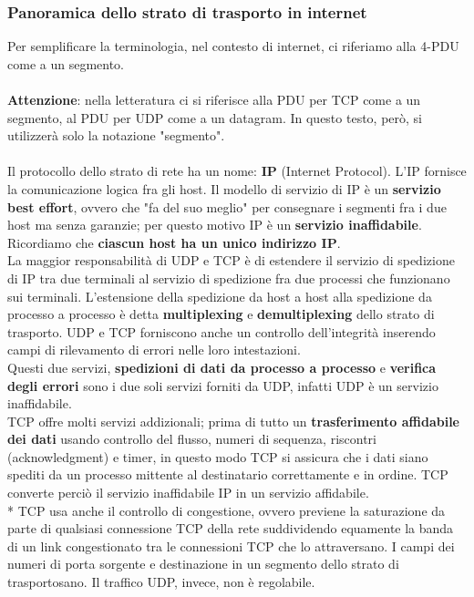 \documentclass[11pt,a4paper]{article}
\begin{document}
\subsubsection{Panoramica dello strato di trasporto in internet}
Per semplificare la terminologia, nel contesto di internet, ci riferiamo alla 4-PDU come a un segmento. \\ \\
\textbf{Attenzione}: nella letteratura ci si riferisce alla PDU per TCP come a un segmento, al PDU per UDP come a un datagram. In questo testo, però, si utilizzerà solo la notazione "segmento".\\ \\
Il protocollo dello strato di rete ha un nome: \textbf{IP} (Internet Protocol). L'IP fornisce la comunicazione logica fra gli host. Il modello di servizio di IP è un \textbf{servizio best effort}, ovvero che "fa del suo meglio" per consegnare i segmenti fra i due host ma senza garanzie; per questo motivo IP è un \textbf{servizio inaffidabile}. Ricordiamo che \textbf{ciascun host ha un unico indirizzo IP}.\\
La maggior responsabilità di UDP e TCP è di estendere il servizio di spedizione di IP tra due terminali al servizio di spedizione fra due processi che funzionano sui terminali. L'estensione della spedizione da host a host alla spedizione da processo a processo è detta \textbf{multiplexing} e \textbf{demultiplexing} dello strato di trasporto. UDP e TCP forniscono anche un controllo dell'integrità inserendo campi di rilevamento di errori nelle loro intestazioni. \\
Questi due servizi, \textbf{spedizioni di dati da processo a processo} e \textbf{verifica degli errori} sono i due soli servizi forniti da UDP, infatti UDP è un servizio inaffidabile.\\
TCP offre molti servizi addizionali; prima di tutto un \textbf{trasferimento affidabile dei dati} usando controllo del flusso, numeri di sequenza, riscontri (acknowledgment) e timer, in questo modo TCP si assicura che i dati siano spediti da un processo mittente al destinatario correttamente e in ordine. TCP converte perciò il servizio inaffidabile IP in un servizio affidabile. \\*
TCP usa anche il controllo di congestione, ovvero previene la saturazione da parte di qualsiasi connessione TCP della rete suddividendo equamente la banda di un link congestionato tra le connessioni TCP che lo attraversano. I campi dei numeri di porta sorgente e destinazione in un segmento dello strato di trasportosano. Il traffico UDP, invece, non è regolabile.
\end{document}
